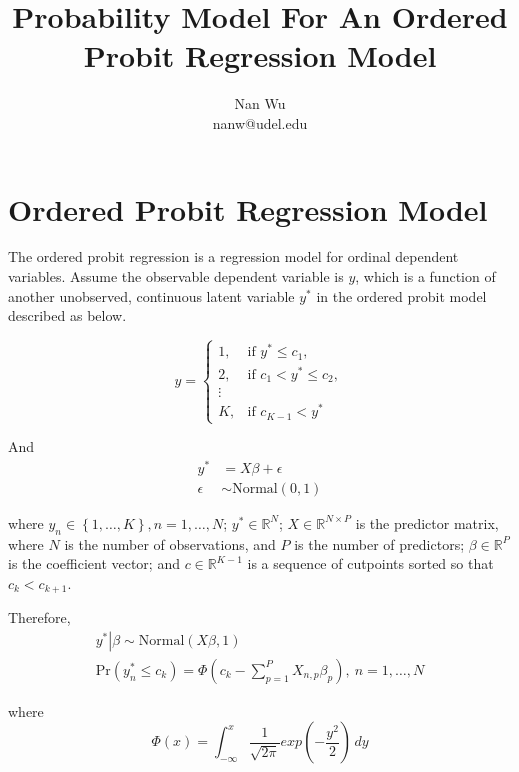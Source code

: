 \documentclass[12pt]{article}
\def\eqa{\left(c_k - \sum \limits_{p=1}^P X_{n,p}\beta_p \right)}
\begin{document}
\title{Probability Model For An Ordered Probit Regression Model}
\author{Nan Wu \\ nanw@udel.edu}
\date{}
\maketitle

\section{Ordered Probit Regression Model}

The ordered probit regression is a regression model for ordinal dependent variables. Assume the observable dependent variable is $y$, which is a function of another unobserved, continuous latent variable $y^*$ in the ordered probit model described as below.

\begin{equation*}
  y= \begin{cases}
    1, & \text{if $y^* \leq c_1$},\\
    2, & \text{if $c_1 < y^* \leq c_2$},\\
    \vdots \\
    K, & \text{if $c_{K-1} < y^*$}
  \end{cases}
\end{equation*}

And
\begin{align*}
  y^* &= X\beta + \epsilon \\
  \epsilon &\sim \mathrm{Normal}\left(0,1\right)
\end{align*}

where $y_n \in \left \{1,\ldots, K\right \}, n=1,\ldots,N$; $y^* \in \mathbb{R}^N$; $X\in \mathbb{R}^{N \times P}$ is the predictor matrix, where $N$ is the number of observations, and $P$ is the number of predictors; $\beta \in \mathbb{R}^P$ is the coefficient vector; and $c \in \mathbb{R}^{K-1}$  is a sequence of cutpoints sorted so that $c_k<c_{k+1}$.

Therefore,
\begin{gather*}
  \left. y^* \right|\beta \sim \mathrm{Normal}\left(X\beta, 1\right)\\
  \mathrm{Pr}\left(y^*_n \leq c_k\right)=\Phi \eqa, \ n=1,\ldots,N
\end{gather*}

where
\begin{equation}
  \Phi\left(x\right)=\int_{-\infty}^x \frac{1}{\sqrt{2\pi}}exp\left(-\frac{y^2}{2}\right)\,dy
\end{equation}
\end{document}
